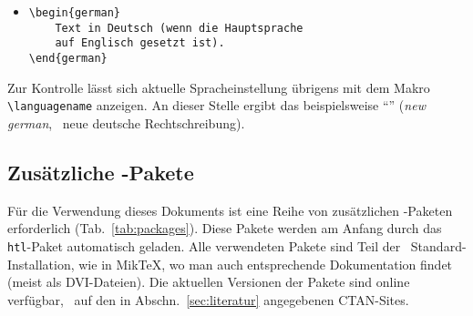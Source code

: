 \begin{itemize}
\item[] 
\verb!\begin{german}!\\
\verb!    Text in Deutsch (wenn die Hauptsprache!\\
\verb!    auf Englisch gesetzt ist).!\\
\verb!\end{german}!
\end{itemize}
%
Zur Kontrolle lässt sich aktuelle Spracheinstellung übrigens mit dem Makro \verb!\languagename!
anzeigen. An dieser Stelle ergibt das beispielsweise "`\texttt{\languagename}"' (\emph{new german}, \dah\ neue deutsche Rechtschreibung).


\subsection{Zusätzliche {\latex}-Pakete}

Für die Verwendung dieses Dokuments ist eine Reihe von
zusätzlichen \latex-Paketen erforderlich
(Tab.~\ref{tab:packages}). Diese Pakete werden am Anfang
durch das \texttt{htl}-Paket automatisch geladen. 
Alle verwendeten Pakete sind
Teil der \latex\ Standard-Installation, wie \zB in MikTeX, wo
man auch entsprechende Dokumentation findet (meist als DVI-Dateien).
Die aktuellen Versionen der Pakete sind online verfügbar, \ua\ auf den
in Abschn.~\ref{sec:literatur} angegebenen CTAN-Sites.

